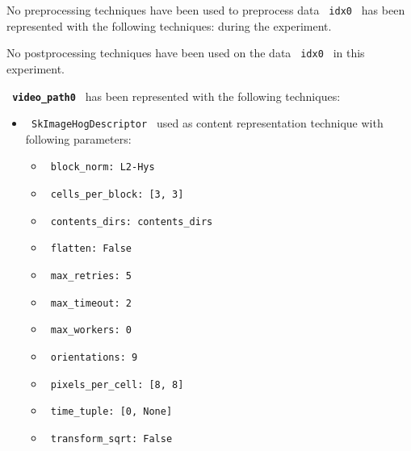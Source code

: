 \documentclass[11pt]{article}
\begin{document}
No preprocessing techniques have been used to preprocess data \lstinline[style=verbatim-text]| idx0 | has been represented with the following techniques:
 during the experiment.
\hfill\break
\hfill\break



No postprocessing techniques have been used on the data \lstinline[style=verbatim-text]| idx0 | in this experiment.
\hfill\break
\hfill\break



\textbf{\lstinline[style=verbatim-text]| video_path0 |} has been represented with the following techniques:
\hfill\break
\hfill\break

\begin{itemize}
                                                            
            \item
        \verb| SkImageHogDescriptor | used as content representation technique with following parameters:
        \begin{itemize}
                            \item
                \verb| block_norm: L2-Hys|
                            \item
                \verb| cells_per_block: [3, 3]|
                            \item
                \verb| contents_dirs: contents_dirs|
                            \item
                \verb| flatten: False|
                            \item
                \verb| max_retries: 5|
                            \item
                \verb| max_timeout: 2|
                            \item
                \verb| max_workers: 0|
                            \item
                \verb| orientations: 9|
                            \item
                \verb| pixels_per_cell: [8, 8]|
                            \item
                \verb| time_tuple: [0, None]|
                            \item
                \verb| transform_sqrt: False|
                    \end{itemize}
    \end{itemize}
\hfill\break
\hfill\break
\end{document}

